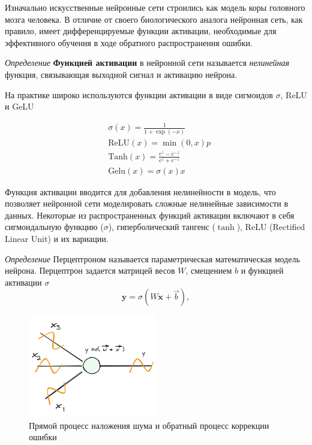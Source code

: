 Изначально искусственные нейронные сети строились как модель коры головного мозга человека. 
В отличие от своего биологического аналога нейронная сеть, как правило, имеет дифференцируемые функции 
активации, необходимые для эффективного обучения в ходе обратного распространения ошибки.

\textit{Определение} \textbf{Функцией активации} в нейронной сети называется \textit{нелинейная} функция,
связывающая выходной сигнал и активацию нейрона. 

На практике широко используются функции активации в виде сигмоидов $\sigma$, ReLU \cite{agarap2018deep} и 
GeLU \cite{hendrycks2016gaussian}

\begin{equation}
  \begin{aligned}
    & \sigma(x) = \frac{1}{1+\exp(-x)} \\
    &\text{ReLU}(x) = \min(0,x)p \\
    &\text{Tanh}(x) = \frac{e^{z}-e^{-z}}{e^{z}+e^{-z}} \\
    &\text{Gelu}(x) = \sigma(x) x 
  \end{aligned}
\end{equation}

Функция активации вводится для добавления нелинейности в модель, что позволяет нейронной сети моделировать сложные 
нелинейные зависимости в данных. Некоторые из распространенных функций активации включают в себя сигмоидальную 
функцию (\( \sigma \)), гиперболический тангенс (\( \tanh \)), ReLU (Rectified Linear Unit) и их вариации.

\textit{Определение} Перцептроном называется параметрическая математическая модель нейрона. Перцептрон
задается матрицей весов $W$, смещением $b$ и функцией активации $\sigma$
\begin{equation}
  \mathbf{y} = \sigma(W \mathbf{x} + \vec{b}),
\end{equation}

\begin{figure}[h]
  \centering
  \includegraphics[width=0.5\textwidth]{assets/ml/nn/perceptron.excalidraw.png}
  \caption{Прямой процесс наложения шума и обратный процесс коррекции ошибки \cite{stablediffusion}}
  \label{perceptron}
\end{figure}

